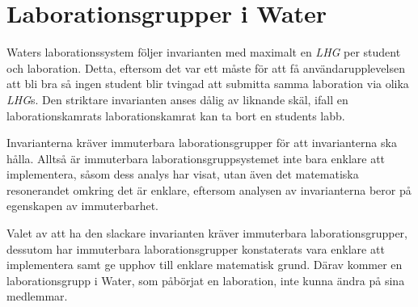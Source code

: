 \section{Laborationsgrupper i Water}

Waters laborationssystem följer invarianten med maximalt en \emph{LHG} per student
och laboration. Detta, eftersom det var ett måste för att få användarupplevelsen
att bli bra så ingen student blir tvingad att submitta samma laboration via olika
\emph{LHG}s. Den striktare invarianten anses dålig av liknande skäl, ifall en 
laborationskamrats laborationskamrat kan ta bort en students labb.

Invarianterna kräver immuterbara laborationsgrupper för att invarianterna ska
hålla. Alltså är immuterbara laborationsgruppsystemet inte bara enklare att
implementera, såsom dess analys har visat, utan även det matematiska
resonerandet omkring det är enklare, eftersom analysen av invarianterna beror
på egenskapen av immuterbarhet.

Valet av att ha den slackare invarianten kräver immuterbara laborationsgrupper,
dessutom har immuterbara laborationsgrupper konstaterats vara enklare att implementera
samt ge upphov till enklare matematisk grund. Därav kommer en laborationsgrupp
i Water, som påbörjat en laboration, inte kunna ändra på sina medlemmar.
